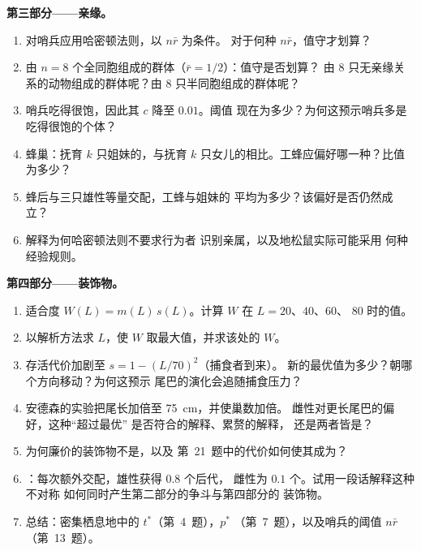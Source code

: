 \begin{problem}
\medskip
\noindent\textbf{第三部分——亲缘。}
\begin{enumerate}[resume]
  \item 对哨兵应用哈密顿法则，以 $n\bar r$ 为条件。
        对于何种 $n\bar r$，值守才划算？
  \item 由 $n = 8$ 个全同胞组成的群体（$\bar r = 1/2$）：值守是否划算？
        由 8 只无亲缘关系的动物组成的群体呢？由 8 只半同胞组成的群体呢？
  \item 哨兵吃得很饱，因此其 $c$ 降至 $0.01$。阈值
        现在为多少？为何这预示哨兵多是
        吃得很饱的个体？
  \item 蜂巢：抚育 $k$ 只姐妹的，与抚育 $k$
        只女儿的相比。工蜂应偏好哪一种？比值为多少？
  \item 蜂后与三只雄性等量交配，工蜂与姐妹的
        平均为多少？该偏好是否仍然成立？
  \item 解释为何哈密顿法则不要求行为者
        识别亲属，以及地松鼠实际可能采用
        何种经验规则。
\end{enumerate}

\medskip
\noindent\textbf{第四部分——装饰物。}
\begin{enumerate}[resume]
  \item 适合度 $W(L) = m(L)\,s(L)$。计算 $W$ 在 $L = 20$、$40$、$60$、
        $80$ 时的值。
  \item 以解析方法求 $L$，使 $W$ 取最大值，并求该处的 $W$。
  \item 存活代价加剧至 $s = 1 - (L/70)^{2}$（捕食者到来）。
        新的最优值为多少？朝哪个方向移动？为何这预示
        尾巴的演化会追随捕食压力？
  \item 安德森的实验把尾长加倍至 \qty{75}{cm}，并使巢数加倍。
        雌性对更长尾巴的偏好，这种“超过最优”
        是否符合的解释、累赘的解释，
        还是两者皆是？
  \item 为何廉价的装饰物不是，以及
        第~21~题中的代价如何使其成为？
  \item {}：每次额外交配，雄性获得 $0.8$ 个后代，
        雌性为 $0.1$ 个。试用一段话解释这种不对称
        如何同时产生第二部分的争斗与第四部分的
        装饰物。
  \item 总结：密集栖息地中的 $t^{*}$（第~4~题），$p^{*}$
        （第~7~题），以及哨兵的阈值 $n\bar r$
        （第~13~题）。
\end{enumerate}
\end{problem}
